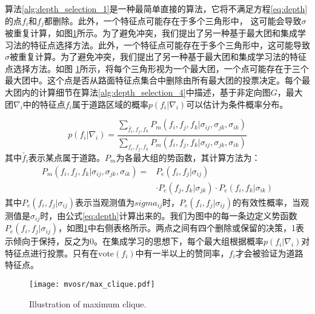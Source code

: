 算法\ref{alg:depth_selection_1}是一种最简单直接的算法，它将不满足方程\eqref{eq:depth}的点$f_i$和$f_j$都删除。此外，一个特征点可能存在于多个三角形中，
这可能会导致$\sigma$被重复计算，如图\ref{fig:max_clique}所示。为了避免冲突，我们提出了另一种基于最大团和集成学习法的特征点选择方法。此外，一个特征点可能存在于多个三角形中，这可能导致$\sigma$被重复计算。为了避免冲突，我们提出了另一种基于最大团和集成学习法的特征点选择方法。如图 \ref{fig:max_clique}所示，将每个三角形视为一个最大团，一个点可能存在于三个最大团中。这个点是否从路面特征点集合中删除由所有最大团的投票决定。每个最大团内的计算细节在算法\ref{alg:depth_selection_4}中描述，基于非定向图$G$，最大团$\nabla_{i}$中的特征点$f_i$属于道路区域的概率$p(f_i|\nabla_{i})$可以估计为条件概率分布。

\begin{equation}
    p(f_i|\nabla_{i}) =\frac{\sum_{\check{f_i},f_j,f_k}P_m(f_i,f_j,f_k|\sigma_{ij},\sigma_{jk},\sigma_{ik})}{\sum_{f_i,f_j,f_k}P_m(f_i,f_j,f_k|\sigma_{ij},\sigma_{jk},\sigma_{ik})}
    \label{eq:feature_poss}
\end{equation}
其中$\check{f_i}$表示某点属于道路。$P_m$为各最大组的势函数，其计算方法为：
\begin{equation}%
    \begin{split}
        P_m(f_i,f_j,f_k|\sigma_{ij},\sigma_{jk},\sigma_{ik}) = &{P_e(f_i,f_j|\sigma_{ij})}   \\
        & \cdot{P_e(f_j,f_k|\sigma_{jk})} \cdot{P_e(f_i,f_k|\sigma_{ik})}
        \label{eq:clique_potential}
    \end{split}
\end{equation}
其中$P_e(f_i,f_j|\sigma_{ij})$表示当观测值为$sigma_{ij}$时，$P_e(f_i,f_j|\sigma_{ij})$的有效性概率，当观测值是$\sigma_{ij}$时，由公式\eqref{eq:depth}计算出来的。我们为图中的每一条边定义势函数$P_e(f_i,f_j|\sigma_{ij})$，如图\ref{fig:max_clique}中右侧表格所示。两点之间有四个删除或保留的决策，1表示倾向于保持，反之为0。在集成学习的思想下，每个最大组根据概率$p(f_i|\nabla_{i})$对特征点进行投票。只有在$\text{vote}(f_i)$中有一半以上的赞同率，$f_i$才会被验证为道路特征点。

\begin{figure}
    \centering
    \texttt{[image: mvosr/max\_clique.pdf]}
    \caption{Illustration of maximum clique.}
    \label{fig:max_clique}
\end{figure}
    
